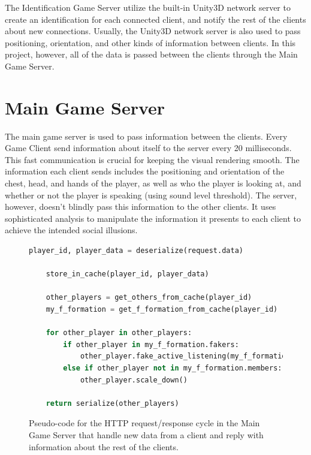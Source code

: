 \documentclass[]{simple-thesis}
\begin{document}
The Identification Game Server utilize the built-in Unity3D network server to create an identification for each connected client, and notify the rest of the clients about new connections.
Usually, the Unity3D network server is also used to pass positioning, orientation, and other kinds of information between clients.
In this project, however, all of the data is passed between the clients through the Main Game Server.

\section{Main Game Server}

The main game server is used to pass information between the clients.
Every Game Client send information about itself to the server every 20 milliseconds.
This fast communication is crucial for keeping the visual rendering smooth.
The information each client sends includes the positioning and orientation of the chest, head, and hands of the player, as well as who the player is looking at, and whether or not the player is speaking (using sound level threshold).
The server, however, doesn't blindly pass this information to the other clients.
It uses sophisticated analysis to manipulate the information it presents to each client to achieve the intended social illusions.

\begin{figure}
  \begin{lstlisting}[language=Python]
    player_id, player_data = deserialize(request.data)

    store_in_cache(player_id, player_data)

    other_players = get_others_from_cache(player_id)
    my_f_formation = get_f_formation_from_cache(player_id)

    for other_player in other_players:
        if other_player in my_f_formation.fakers:
            other_player.fake_active_listening(my_f_formation.speaker)
        else if other_player not in my_f_formation.members:
            other_player.scale_down()
           
    return serialize(other_players)
  \end{lstlisting}
  \caption{Pseudo-code for the HTTP request/response cycle in the Main Game Server that handle new data from a client and reply with information about the rest of the clients.}
  \label{fig:system:main_server_pseudocode}
\end{figure}
\end{document}
